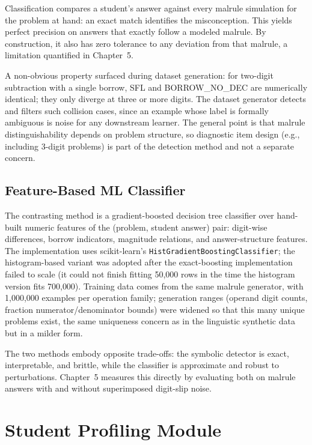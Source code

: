 Classification compares a student's answer against every malrule simulation for the problem at hand: an exact match identifies the misconception. This yields perfect precision on answers that exactly follow a modeled malrule. By construction, it also has zero tolerance to any deviation from that malrule, a limitation quantified in Chapter~5.

A non-obvious property surfaced during dataset generation: for two-digit subtraction with a single borrow, SFL and BORROW\_NO\_DEC are numerically identical; they only diverge at three or more digits. The dataset generator detects and filters such collision cases, since an example whose label is formally ambiguous is noise for any downstream learner. The general point is that malrule distinguishability depends on problem structure, so diagnostic item design (e.g., including 3-digit problems) is part of the detection method and not a separate concern.

\subsection{Feature-Based ML Classifier}
\label{sec:impl_math_ml}

The contrasting method is a gradient-boosted decision tree classifier over hand-built numeric features of the (problem, student answer) pair: digit-wise differences, borrow indicators, magnitude relations, and answer-structure features. The implementation uses scikit-learn's \texttt{HistGradientBoostingClassifier}; the histogram-based variant was adopted after the exact-boosting implementation failed to scale (it could not finish fitting 50{,}000 rows in the time the histogram version fits 700{,}000). Training data comes from the same malrule generator, with 1{,}000{,}000 examples per operation family; generation ranges (operand digit counts, fraction numerator/denominator bounds) were widened so that this many unique problems exist, the same uniqueness concern as in the linguistic synthetic data but in a milder form.

The two methods embody opposite trade-offs: the symbolic detector is exact, interpretable, and brittle, while the classifier is approximate and robust to perturbations. Chapter~5 measures this directly by evaluating both on malrule answers with and without superimposed digit-slip noise.

\section{Student Profiling Module}
\label{sec:impl_profile}


